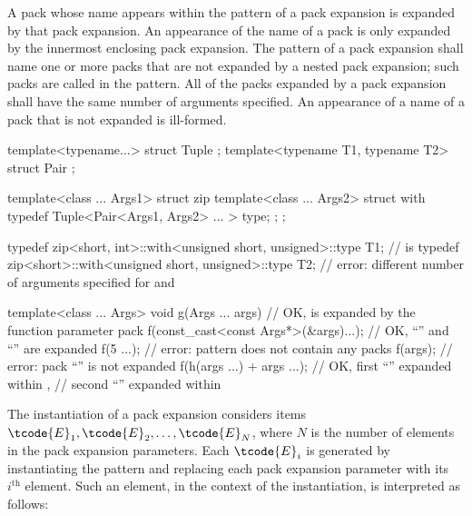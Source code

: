 \pnum
A pack whose name appears within the pattern of a pack
expansion is expanded by that pack expansion. An appearance of the name of
a pack is only expanded by the innermost enclosing pack expansion.
The pattern of a pack expansion shall name one or more packs that
are not expanded by a nested pack expansion; such packs are called
 in the pattern. All of the packs expanded
by a pack expansion shall have the same number of arguments specified. An
appearance of a name of a pack that is not expanded is
ill-formed.
\begin{example}
\begin{codeblock}
template<typename...> struct Tuple {};
template<typename T1, typename T2> struct Pair {};

template<class ... Args1> struct zip {
  template<class ... Args2> struct with {
    typedef Tuple<Pair<Args1, Args2> ... > type;
  };
};

typedef zip<short, int>::with<unsigned short, unsigned>::type T1;
    //  is 
typedef zip<short>::with<unsigned short, unsigned>::type T2;
    // error: different number of arguments specified for  and 

template<class ... Args>
  void g(Args ... args) {                   // OK,  is expanded by the function parameter pack 
    f(const_cast<const Args*>(&args)...);   // OK, ``'' and ``'' are expanded
    f(5 ...);                               // error: pattern does not contain any packs
    f(args);                                // error: pack ``'' is not expanded
    f(h(args ...) + args ...);              // OK, first ``'' expanded within ,
                                            // second ``'' expanded within 
  }
\end{codeblock}
\end{example}

\pnum
The instantiation of a pack expansion considers
items $\tcode{E}_1, \tcode{E}_2, \dotsc, \tcode{E}_N$,
where
$N$ is the number of elements in the pack expansion parameters.
Each $\tcode{E}_i$ is generated by instantiating the pattern and
replacing each pack expansion parameter with its $i^\text{th}$ element.
Such an element, in the context of the instantiation, is interpreted as
follows:

